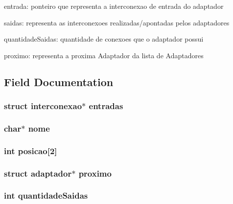 entrada\-: ponteiro que representa a interconexao de entrada do adaptador

saidas\-: representa as interconexoes realizadas/apontadas pelos adaptadores

quantidade\-Saidas\-: quantidade de conexoes que o adaptador possui

proximo\-: representa a proxima Adaptador da lista de Adaptadores 

\subsection{Field Documentation}
\hypertarget{structadaptador_ae28777a0a252764c89fe126c8d7fba4a}{
\subsubsection[{entradas}]{\setlength{\rightskip}{0pt plus 5cm}struct {\bf interconexao}$\ast$ entradas}}\label{structadaptador_ae28777a0a252764c89fe126c8d7fba4a}
\hypertarget{structadaptador_ae2a0f66178bb1c4d42e2b70ec9426ccb}{
\subsubsection[{nome}]{\setlength{\rightskip}{0pt plus 5cm}char$\ast$ nome}}\label{structadaptador_ae2a0f66178bb1c4d42e2b70ec9426ccb}
\hypertarget{structadaptador_a7e30d633898517077a4363ad6fade5b6}{
\subsubsection[{posicao}]{\setlength{\rightskip}{0pt plus 5cm}int posicao\mbox{[}2\mbox{]}}}\label{structadaptador_a7e30d633898517077a4363ad6fade5b6}
\hypertarget{structadaptador_a13b5e7e3587fb01bede3f317405b5af2}{
\subsubsection[{proximo}]{\setlength{\rightskip}{0pt plus 5cm}struct {\bf adaptador}$\ast$ proximo}}\label{structadaptador_a13b5e7e3587fb01bede3f317405b5af2}
\hypertarget{structadaptador_a135fa6c241ccfd74d2e8413ebefc0579}{
\subsubsection[{quantidade\-Saidas}]{\setlength{\rightskip}{0pt plus 5cm}int quantidade\-Saidas}}\label{structadaptador_a135fa6c241ccfd74d2e8413ebefc0579}
